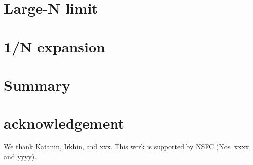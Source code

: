 \documentclass[aps,preprint,superscriptaddress]{revtex4-1}
\newcommand{\bea}{\begin{eqnarray}}
\newcommand{\eea}{\end{eqnarray}}
\begin{document}
\section{Large-N limit}

\section{1/N expansion}

\section{Summary}

\section{acknowledgement}
We thank Katanin, Irkhin, and xxx. This work is supported by NSFC (Nos. xxxx and yyyy).



\end{document}
